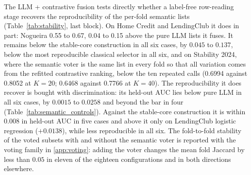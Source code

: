 \documentclass[final,5p,twocolumn]{elsarticle}
\newcommand{\Kfeat}{K}
\begin{document}
The LLM + contrastive fusion tests directly whether a label-free row-reading stage recovers the reproducibility of the per-fold semantic lists (Table~\ref{tab:stability}, last block). On Home Credit and LendingClub it does in part: Nogueira 0.55 to 0.67, 0.04 to 0.15 above the pure LLM lists it fuses. It remains below the stable-core construction in all six cases, by $0.045$ to $0.137$, below the most reproducible classical selector in all six, and on Stability 2024, where the semantic voter is the same list in every fold so that all variation comes from the refitted contrastive ranking, below the ten repeated calls (0.6994 against 0.8052 at $\Kfeat=20$; 0.6468 against 0.7766 at $\Kfeat=40$). The reproducibility it does recover is bought with discrimination: its held-out AUC lies below pure LLM in all six cases, by $0.0015$ to $0.0258$ and beyond the bar in four (Table~\ref{tab:semantic_controls}). Against the stable-core construction it is within $0.008$ in held-out AUC in five cases and above it only on LendingClub logistic regression ($+0.0138$), while less reproducible in all six. The fold-to-fold stability of the voted subsets with and without the semantic voter is reported with the voting family in \ref{app:voting}: adding the voter changes the mean fold Jaccard by less than $0.05$ in eleven of the eighteen configurations and in both directions elsewhere.
\end{document}
